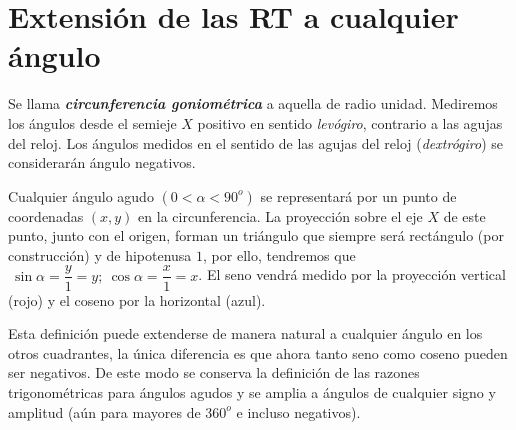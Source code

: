 \section{Extensión de las RT a cualquier ángulo}
\vspace{2mm}

Se llama \emph{\textbf{circunferencia goniométrica}} a aquella de radio unidad. Mediremos los ángulos desde el semieje $X$ positivo en sentido \emph{levógiro}, contrario a las agujas del reloj. Los ángulos medidos en el sentido de las agujas del reloj (\emph{dextrógiro}) se considerarán ángulo negativos.

Cualquier ángulo agudo $(0<\alpha<90^o)$ se representará por un punto de coordenadas $(x,y)$ en la circunferencia. La proyección sobre el eje $X$ de este punto, junto con el origen, forman un triángulo que siempre será rectángulo (por construcción) y de hipotenusa $1$, por ello, tendremos que $\ \sin \alpha =\dfrac y 1 =y;\ \cos \alpha=\dfrac x 1 = x$. El seno vendrá medido por la proyección vertical (rojo) y el coseno por la horizontal (azul).

Esta definición puede extenderse de manera natural a cualquier ángulo en los otros cuadrantes, la única diferencia es que ahora tanto seno como coseno pueden ser negativos. De este modo se conserva la definición de las razones trigonométricas para ángulos agudos y se amplia a ángulos de cualquier signo y amplitud (aún para mayores de $360^o$ e incluso negativos).


